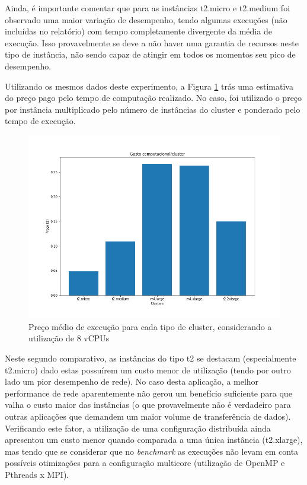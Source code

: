 \documentclass[a4paper,11pt]{article}
\begin{document}
Ainda, é importante comentar que para as instâncias t2.micro e t2.medium foi observado uma maior variação de desempenho, tendo algumas execuções (não incluídas no relatório) com tempo completamente divergente da média de execução. Isso provavelmente se deve a não haver uma garantia de recursos neste tipo de instância, não sendo capaz de atingir em todos os momentos seu pico de desempenho.%

Utilizando os mesmos dados deste experimento, a Figura \ref{fig:precoCluster} trás uma estimativa do preço pago pelo tempo de computação realizado. No caso, foi utilizado o preço por instância multiplicado pelo número de instâncias do cluster e ponderado pelo tempo de execução.


\begin{figure}[h!]
	\center
	\includegraphics[scale=0.4]{figs/AllNodesPreco.png}
	\caption{Preço médio de execução para cada tipo de cluster, considerando a utilização de 8 vCPUs}
	\label{fig:precoCluster}
\end{figure}

\vspace{0.4cm}

Neste segundo comparativo, as instâncias do tipo t2 se destacam (especialmente t2.micro) dado estas possuírem um custo menor de utilização (tendo por outro lado um pior desempenho de rede). No caso desta aplicação, a melhor performance de rede aparentemente não gerou um benefício suficiente para que valha o custo maior das instâncias (o que provavelmente não é verdadeiro para outras aplicações que demandem um maior volume de transferência de dados). Verificando este fator, a utilização de uma configuração distribuída ainda apresentou um custo menor quando comparada a uma única instância (t2.xlarge), mas tendo que se considerar que no \textit{benchmark} as execuções não levam em conta possíveis otimizações para a configuração multicore (utilização de OpenMP e Pthreads x MPI).
\end{document}
